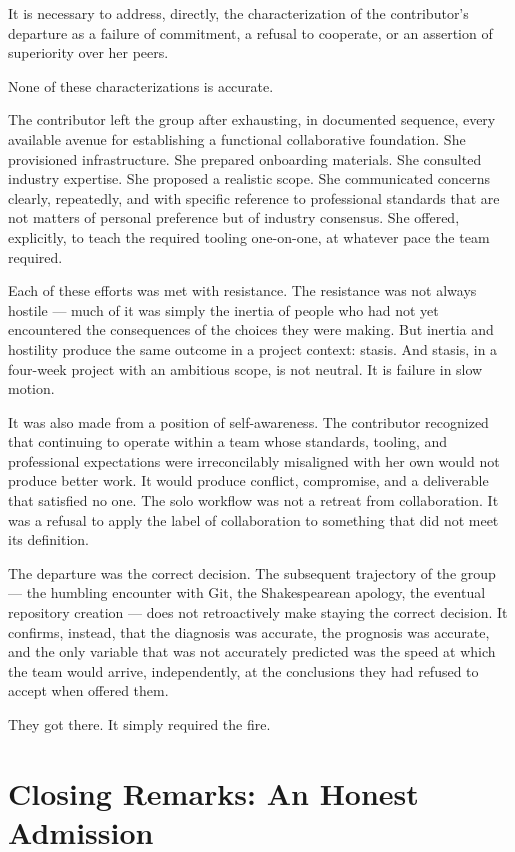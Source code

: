\documentclass[11pt,a4paper]{book}
\begin{document}
It is necessary to address, directly, the characterization of the contributor's departure as a failure of commitment, a refusal to cooperate, or an assertion of superiority over her peers.
 
None of these characterizations is accurate.
 
The contributor left the group after exhausting, in documented sequence, every available avenue for establishing a functional collaborative foundation. She provisioned infrastructure. She prepared onboarding materials. She consulted industry expertise. She proposed a realistic scope. She communicated concerns clearly, repeatedly, and with specific reference to professional standards that are not matters of personal preference but of industry consensus. She offered, explicitly, to teach the required tooling one-on-one, at whatever pace the team required.
 
Each of these efforts was met with resistance. The resistance was not always hostile --- much of it was simply the inertia of people who had not yet encountered the consequences of the choices they were making. But inertia and hostility produce the same outcome in a project context: stasis. And stasis, in a four-week project with an ambitious scope, is not neutral. It is failure in slow motion.
 
It was also made from a position of self-awareness. The contributor recognized that continuing to operate within a team whose standards, tooling, and professional expectations were irreconcilably misaligned with her own would not produce better work. It would produce conflict, compromise, and a deliverable that satisfied no one. The solo workflow was not a retreat from collaboration. It was a refusal to apply the label of collaboration to something that did not meet its definition.
 
The departure was the correct decision. The subsequent trajectory of the group --- the humbling encounter with Git, the Shakespearean apology, the eventual repository creation --- does not retroactively make staying the correct decision. It confirms, instead, that the diagnosis was accurate, the prognosis was accurate, and the only variable that was not accurately predicted was the speed at which the team would arrive, independently, at the conclusions they had refused to accept when offered them.
 
They got there. It simply required the fire.
 
\section{Closing Remarks: An Honest Admission}
 
\end{document}
